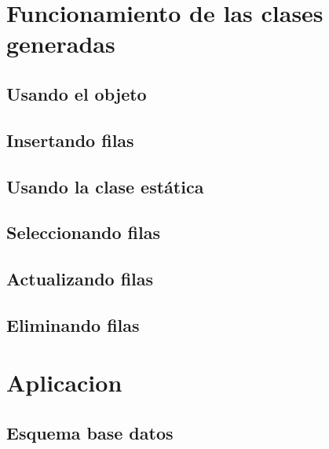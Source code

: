 \documentclass[12pt, oneside]{article}
\begin{document}
\section{Funcionamiento de las clases generadas}
	\subsection{Usando el objeto}
		

	\subsection{Insertando filas}
		

	\subsection{Usando la clase estática}
		

	\subsection{Seleccionando filas}
		

	\subsection{Actualizando filas} 
		

	\subsection{Eliminando filas}
		

\section{Aplicacion}
\subsection{Esquema base datos}

\end{document}
